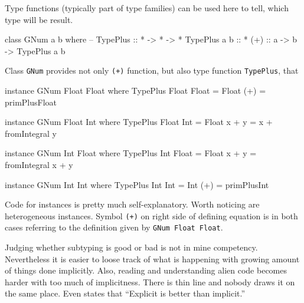 \documentclass[11pt,oneside,draft]{fithesis2}
\newcommand\uv[1]{``#1''}
\theoremstyle{definition}
\begin{document}
Type functions (typically part of type families) can be used here
to tell, which type will be result.
\begin{code}
class GNum a b where
    -- TypePlus :: * -> * -> *
    TypePlus a b :: *
    (+) :: a -> b -> TypePlus a b
\end{code}
Class \texttt{GNum} provides not only \texttt{(+)} function, but
also type function \texttt{TypePlus}, that

\begin{code}
instance GNum Float Float where
    TypePlus Float Float = Float
    (+) = primPlusFloat

instance GNum Float Int where
    TypePlus Float Int = Float
    x + y = x + fromIntegral y

instance GNum Int Float where
    TypePlus Int Float = Float
    x + y = fromIntegral x + y

instance GNum Int Int where
    TypePlus Int Int = Int
    (+) = primPlusInt
\end{code}

Code for instances is pretty much self-explanatory.
Worth noticing are heterogeneous instances. Symbol
\texttt{(+)} on right side of defining equation is
in both cases referring to the definition given
by \texttt{GNum Float Float}.

Judging whether subtyping is good or bad is not in mine
competency. Nevertheless it is easier to loose track of what is happening
with growing amount of things done implicitly.  Also, reading and
understanding alien code becomes harder with too much of
implicitness. There is thin line and nobody draws it on the same place.
Even \cite{python:zen} states that \uv{Explicit is better than implicit.}




\end{document}
